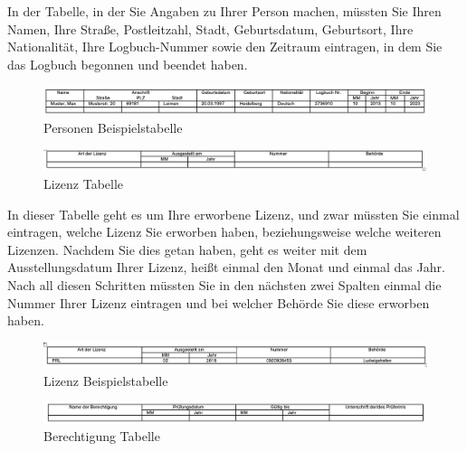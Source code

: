\documentclass[a4paper]{article} %
\begin{document}
    \noindent In der Tabelle, in der Sie Angaben zu Ihrer Person machen, müssten Sie Ihren Namen, Ihre Straße, Postleitzahl, Stadt, Geburtsdatum, Geburtsort, Ihre Nationalität, Ihre Logbuch-Nummer sowie den Zeitraum eintragen, in dem Sie das Logbuch begonnen und beendet haben.
    \begin{figure}[h!]
        \centering
        \includegraphics[width=17cm]{Personen_Beispiel.png}
        \caption{Personen Beispielstabelle}
        \label{fig:my_label}
    \end{figure}

    \begin{figure}[h!]
        \centering
        \includegraphics[width=17cm]{Lizenz.png}
        \caption{Lizenz Tabelle}
        \label{fig:my_label}
    \end{figure}
    
    \noindent In dieser Tabelle geht es um Ihre erworbene Lizenz, und zwar müssten Sie einmal eintragen, welche Lizenz Sie erworben haben, beziehungsweise welche weiteren Lizenzen. Nachdem Sie dies getan haben, geht es weiter mit dem Ausstellungsdatum Ihrer Lizenz, heißt einmal den Monat und einmal das Jahr. Nach all diesen Schritten müssten Sie in den nächsten zwei Spalten einmal die Nummer Ihrer Lizenz eintragen und bei welcher Behörde Sie diese erworben haben.\\
    
    \begin{figure}[h!]
        \centering
        \includegraphics[width=17cm]{Lizenz_beispiel.png}
        \caption{Lizenz Beispielstabelle}
        \label{fig:my_label}
    \end{figure}

    \begin{figure}[h!]
        \centering
        \includegraphics[width=17cm]{Berechtigung.png}
        \caption{Berechtigung Tabelle}
        \label{fig:my_label}
    \end{figure}
\end{document}
